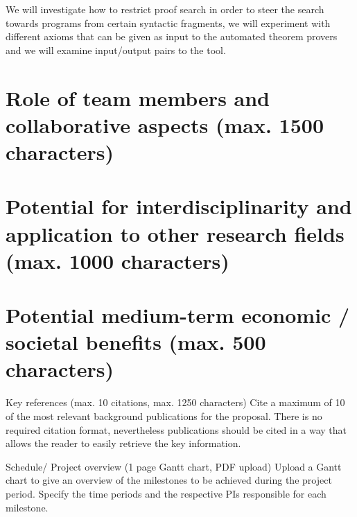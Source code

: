 \documentclass[a4paper,12pt]{article}
\begin{document}
We will investigate how to restrict proof search in order to steer the search towards programs from certain syntactic fragments, we will experiment with different axioms that can be given as input to the automated theorem provers and we will examine input/output pairs to the tool.

\section{Role of team members and collaborative aspects (max. 1500 characters)}

\section{Potential for interdisciplinarity and application to other research fields (max. 1000 characters)}

\section{Potential medium-term economic / societal benefits (max. 500 characters)}

Key references (max. 10 citations, max. 1250 characters)
Cite a maximum of 10 of the most relevant background publications for the proposal. There is no required citation format, nevertheless publications should be cited in a way that allows the reader to easily retrieve the key information.

Schedule/ Project overview (1 page Gantt chart, PDF upload)
Upload a Gantt chart to give an overview of the milestones to be achieved during the project period. Specify the time periods and the respective PIs responsible for each milestone.
\end{document}
